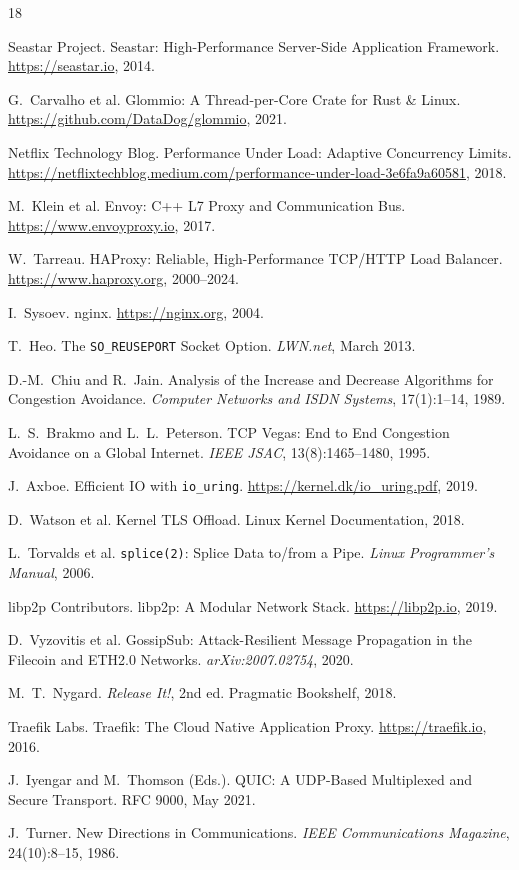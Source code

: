 \documentclass[a4paper, 11pt]{article}
\begin{document}

\begin{thebibliography}{18}

Seastar Project.
{Seastar: High-Performance Server-Side Application Framework}.
\url{https://seastar.io}, 2014.

G.~Carvalho et al.
{Glommio: A Thread-per-Core Crate for Rust \& Linux}.
\url{https://github.com/DataDog/glommio}, 2021.

Netflix Technology Blog.
{Performance Under Load: Adaptive Concurrency Limits}.
\url{https://netflixtechblog.medium.com/performance-under-load-3e6fa9a60581}, 2018.

M.~Klein et al.
{Envoy: C++ L7 Proxy and Communication Bus}.
\url{https://www.envoyproxy.io}, 2017.

W.~Tarreau.
{HAProxy: Reliable, High-Performance TCP/HTTP Load Balancer}.
\url{https://www.haproxy.org}, 2000--2024.

I.~Sysoev.
{nginx}.
\url{https://nginx.org}, 2004.

T.~Heo.
{The \texttt{SO\_REUSEPORT} Socket Option}.
\emph{LWN.net}, March 2013.

D.-M.~Chiu and R.~Jain.
{Analysis of the Increase and Decrease Algorithms for Congestion Avoidance}.
\emph{Computer Networks and ISDN Systems}, 17(1):1--14, 1989.

L.~S.~Brakmo and L.~L.~Peterson.
{TCP Vegas: End to End Congestion Avoidance on a Global Internet}.
\emph{IEEE JSAC}, 13(8):1465--1480, 1995.

J.~Axboe.
{Efficient IO with \texttt{io\_uring}}.
\url{https://kernel.dk/io_uring.pdf}, 2019.

D.~Watson et al.
{Kernel TLS Offload}.
Linux Kernel Documentation, 2018.

L.~Torvalds et al.
\texttt{splice(2)}: Splice Data to/from a Pipe.
\emph{Linux Programmer's Manual}, 2006.

{libp2p Contributors}.
{libp2p: A Modular Network Stack}.
\url{https://libp2p.io}, 2019.

D.~Vyzovitis et al.
{GossipSub: Attack-Resilient Message Propagation in the Filecoin and ETH2.0 Networks}.
\emph{arXiv:2007.02754}, 2020.

M.~T.~Nygard.
\emph{Release It!}, 2nd ed.
Pragmatic Bookshelf, 2018.

{Traefik Labs}.
{Traefik: The Cloud Native Application Proxy}.
\url{https://traefik.io}, 2016.

J.~Iyengar and M.~Thomson (Eds.).
{QUIC: A UDP-Based Multiplexed and Secure Transport}.
RFC 9000, May 2021.

J.~Turner.
{New Directions in Communications}.
\emph{IEEE Communications Magazine}, 24(10):8--15, 1986.

\end{thebibliography}
\end{document}
